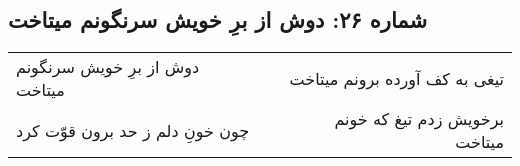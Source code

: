 \begin{center}
\section*{شماره ۲۶: دوش از برِ خویش سرنگونم میتاخت}
\label{sec:026}
\begin{longtable}{l p{0.5cm} r}
دوش از برِ خویش سرنگونم میتاخت
&&
تیغی به کف آورده برونم میتاخت
\\
چون خونِ دلم ز حد برون قوّت کرد
&&
برخویش زدم تیغ که خونم میتاخت
\\
\end{longtable}
\end{center}
